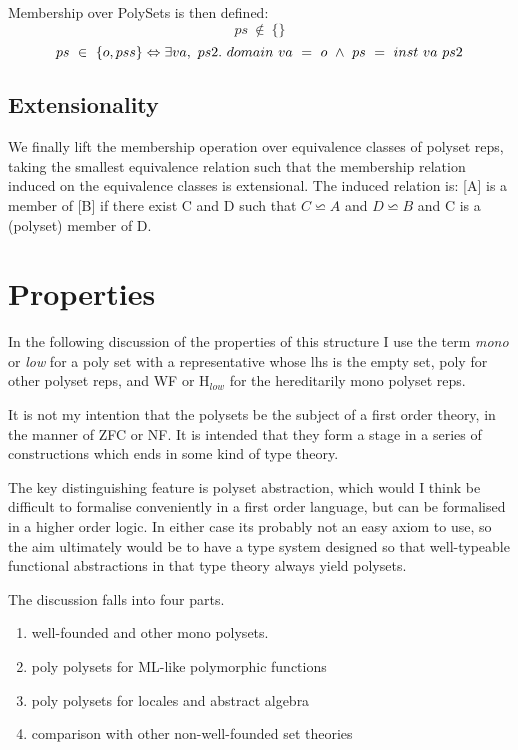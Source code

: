 \documentclass[numreferences]{rbjk}
\begin{document}
\begin{article}
Membership over PolySets is then defined:
\begin{displaymath}
ps\ \not\in\ \{\}
\end{displaymath}
\begin{displaymath}
ps\ \in\ \{o,pss\}\\
\Leftrightarrow\\
\exists va,\ ps2.\ domain\ va\ =\ o\ \wedge\ ps\ =\ inst\ va\ ps2
\end{displaymath}

\subsection{Extensionality}

We finally lift the membership operation over equivalence classes of polyset reps, taking the smallest equivalence relation such that the membership relation induced on the equivalence classes is extensional.
The induced relation is: [A] is a member of [B] if there exist C and D such that $C \backsimeq A$ and $D \backsimeq B$ and C is a (polyset) member of D.

\section{Properties}

In the following discussion of the properties of this structure I use the term {\it mono} or {\it low} for a poly set with a representative whose lhs is the empty set, poly for other polyset reps, and WF or H$_{low}$ for the hereditarily mono polyset reps.

It is not my intention that the polysets be the subject of a first order theory, in the manner of ZFC or NF.
It is intended that they form a stage in a series of constructions which ends in some kind of type theory.

The key distinguishing feature is polyset abstraction, which would I think be difficult to formalise conveniently in a first order language, but can be formalised in a higher order logic.
In either case its probably not an easy axiom to use, so the aim ultimately would be to have a type system designed so that well-typeable functional abstractions in that type theory always yield polysets.

The discussion falls into four parts.
\begin{enumerate}
\item well-founded and other mono polysets.
\item poly polysets for ML-like polymorphic functions
\item poly polysets for locales and abstract algebra
\item comparison with other non-well-founded set theories
\end{enumerate}


\end{article}
\end{document}
